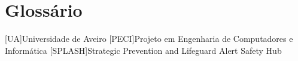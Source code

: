 \chapter{Glossário}

\footnotesize
\SingleSpacing

\begin{multicols}{2}
\begin{acronym}[AAAAAA]

	[UA]{Universidade de Aveiro}
	[PECI]{Projeto em Engenharia de Computadores e Informática}
	[SPLASH]{Strategic Prevention and Lifeguard Alert Safety Hub}
 
\end{acronym}
\end{multicols}

